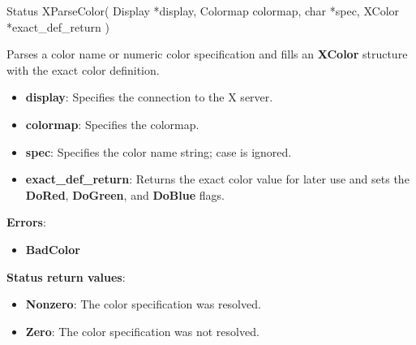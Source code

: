 \documentclass{report}
\begin{document}
\begin{itemize}
            \begin{cppcode}
                Status XParseColor(
                    Display *display,
                    Colormap colormap,
                    char *spec,
                    XColor *exact_def_return
                )
            \end{cppcode}
            \bigbreak \noindent
            Parses a color name or numeric color specification and fills an \textbf{XColor} structure with the exact color definition.
            \begin{itemize}
                \item \textbf{display}: Specifies the connection to the X server.
                \item \textbf{colormap}: Specifies the colormap.
                \item \textbf{spec}: Specifies the color name string; case is ignored.
                \item \textbf{exact\_def\_return}: Returns the exact color value for later use and sets the \textbf{DoRed}, \textbf{DoGreen}, and \textbf{DoBlue} flags.
            \end{itemize}
            \bigbreak \noindent
            \textbf{Errors}:
            \begin{itemize}
                \item \textbf{BadColor}
            \end{itemize}
            \bigbreak \noindent
            \textbf{Status return values}:
            \begin{itemize}
                \item \textbf{Nonzero}: The color specification was resolved.
                \item \textbf{Zero}: The color specification was not resolved.
            \end{itemize}


\end{itemize}
\end{document}
